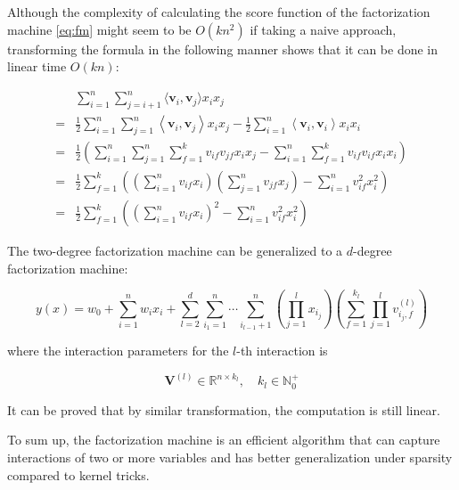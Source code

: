         Although the complexity of calculating the score function of the factorization machine \ref{eq:fm}
        might seem to be $O(kn^2)$ if taking a naive approach,
        transforming the formula in the following manner shows that it can be done in linear time $O(kn)$:

        \begin{align*}
        & \sum_{i=1}^n\sum_{j=i+1}^n \langle \bm{v}_i, \bm{v}_j \rangle x_ix_j \\
        =& \frac { 1} { 2} \sum _ { i = 1} ^ { n } \sum _ { j = 1} ^ { n } \left\langle \bm { v } _ { i } ,\bm { v } _ { j } \right\rangle x _ { i } x _ { j } - \frac { 1} { 2} \sum _ { i = 1} ^ { n } \left\langle \bm { v } _ { i } ,\bm { v } _ { i } \right\rangle x _ { i } x _ { i } \\
        =& \frac { 1} { 2} \left( \sum _ { i = 1} ^ { n } \sum _ { j = 1} ^ { n } \sum _ { f = 1} ^ { k } v _ { if } v _ { jf} x _ { i } x _ { j } - \sum _ { i = 1} ^ { n } \sum _ { f = 1} ^ { k } v _ { if } v _ { if } x _ { i } x _ { i } \right) \\
        =& \frac { 1} { 2} \sum _ { f = 1} ^ { k } \left( \left( \sum _ { i = 1} ^ { n } v _ { if } x _ { i } \right) \left( \sum _ { j = 1} ^ { n } v _ { jf } x _ { j } \right) - \sum _ { i = 1} ^ { n } v _ { if } ^ { 2} x _ { i } ^ { 2} \right) \\
        =& \frac { 1} { 2} \sum _ { f = 1} ^ { k } \left( \left( \sum _ { i = 1} ^ { n } v _ { if } x _ { i } \right) ^ { 2} - \sum _ { i = 1} ^ { n } v _ { if } ^ { 2} x _ { i } ^ { 2} \right)
        \end{align*}

        The two-degree factorization machine can be generalized to a $d$-degree factorization machine:

        \[
        y(x) = w_0 + \sum_{i=1}^n w_ix_i +
        \sum_{l=2}^d\sum_{i_1=1}^n\cdots\sum_{i_{l-1}+1}^n \left( \prod_{j=1}^l x_{i_j} \right)
        \left( \sum_{f=1}^{k_l}\prod_{j=1}^l v_{i_j,f}^{(l)} \right)
        \]

        where the interaction parameters for the $l$-th interaction is

        \[
        \bm{V}^{(l)} \in \mathbb{R}^{n \times k_l}, \quad k_l \in \mathbb{N}_0^+
        \]

        It can be proved that by similar transformation, the computation is still linear. \cite{Rendle2010}

        To sum up, the factorization machine is an efficient algorithm
        that can capture interactions of two or more variables
        and has better generalization under sparsity compared to kernel tricks.
        
